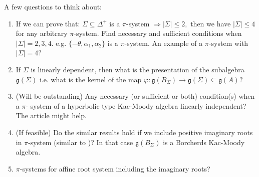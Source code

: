 \documentclass[12pt,reqno]{amsart}
\theoremstyle{plain}
\theoremstyle{definition}
\theoremstyle{remark}
\newcommand{\lie}[1]{\mathfrak{#1}}
\begin{document}
\newpage
{\color{red} A few questions to think about:
\begin{enumerate}
    \item If we can prove that: $\Sigma\subseteq \Delta^+$ is a $\pi$-system $\Longrightarrow |\Sigma|\le 2,$ then we have $|\Sigma|\le 4$ for any arbitrary $\pi$-system. Find necessary and sufficient conditions when $|\Sigma|=2,3,4.$ e.g. $\{-\theta,\alpha_1,\alpha_2\}$ is a $\pi$-system. An example of a $\pi$-system with $|\Sigma|=4?$
    \item If $\Sigma$ is linearly dependent, then what is the presentation of the subalgebra $\lie g(\Sigma)$ i.e. what is the kernel of the map $\varphi: \lie g(B_\Sigma)\to \lie g(\Sigma)\subseteq \lie g(A)?$
    \item (Will be outstanding) Any necessary (or sufficient or both) condition(s) when a $\pi$- system of a hyperbolic type Kac-Moody algebra linearly independent? The article \cite{feingold2004subalgebras} might help.
    \item (If feasible) Do the similar results hold if we include positive imaginary roots in $\pi$-system (similar to \cite{naito1992regular})? In that case $\lie g(B_\Sigma)$ is a Borcherds Kac-Moody algebra.
    \item $\pi$-systems for affine root system including the imaginary roots?
\end{enumerate}}\fi



\end{document}
